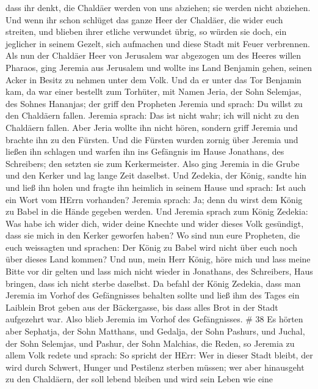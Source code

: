 dass ihr denkt, die Chaldäer werden von uns abziehen; sie werden nicht
abziehen.  Und wenn ihr schon schlüget das ganze Heer der
Chaldäer, die wider euch streiten, und blieben ihrer etliche verwundet
übrig, so würden sie doch, ein jeglicher in seinem Gezelt, sich
aufmachen und diese Stadt mit Feuer verbrennen.  Als nun
der Chaldäer Heer von Jerusalem war abgezogen um des Heeres willen
Pharaos,  ging Jeremia aus Jerusalem und wollte ins Land
Benjamin gehen, seinen Acker in Besitz zu nehmen unter dem Volk.
 Und da er unter das Tor Benjamin kam, da war einer
bestellt zum Torhüter, mit Namen Jeria, der Sohn Selemjas, des Sohnes
Hananjas; der griff den Propheten Jeremia und sprach: Du willst zu den
Chaldäern fallen.  Jeremia sprach: Das ist nicht wahr; ich
will nicht zu den Chaldäern fallen. Aber Jeria wollte ihn nicht hören,
sondern griff Jeremia und brachte ihn zu den Fürsten.  Und
die Fürsten wurden zornig über Jeremia und ließen ihn schlagen und
warfen ihn ins Gefängnis im Hause Jonathans, des Schreibers; den setzten
sie zum Kerkermeister.  Also ging Jeremia in die Grube und
den Kerker und lag lange Zeit daselbst.  Und Zedekia, der
König, sandte hin und ließ ihn holen und fragte ihn heimlich in seinem
Hause und sprach: Ist auch ein Wort vom HErrn vorhanden? Jeremia sprach:
Ja; denn du wirst dem König zu Babel in die Hände gegeben werden.
 Und Jeremia sprach zum König Zedekia: Was habe ich wider
dich, wider deine Knechte und wider dieses Volk gesündigt, dass sie mich
in den Kerker geworfen haben?  Wo sind nun eure Propheten,
die euch weissagten und sprachen: Der König zu Babel wird nicht über
euch noch über dieses Land kommen?  Und nun, mein Herr
König, höre mich und lass meine Bitte vor dir gelten und lass mich nicht
wieder in Jonathans, des Schreibers, Haus bringen, dass ich nicht sterbe
daselbst.  Da befahl der König Zedekia, dass man Jeremia im
Vorhof des Gefängnisses behalten sollte und ließ ihm des Tages ein
Laiblein Brot geben aus der Bäckergasse, bis dass alles Brot in der
Stadt aufgezehrt war. Also blieb Jeremia im Vorhof des Gefängnisses. \#
38  Es hörten aber Sephatja, der Sohn Matthans, und Gedalja,
der Sohn Pashurs, und Juchal, der Sohn Selemjas, und Pashur, der Sohn
Malchias, die Reden, so Jeremia zu allem Volk redete und sprach:
 So spricht der HErr: Wer in dieser Stadt bleibt, der wird
durch Schwert, Hunger und Pestilenz sterben müssen; wer aber hinausgeht
zu den Chaldäern, der soll lebend bleiben und wird sein Leben wie eine
